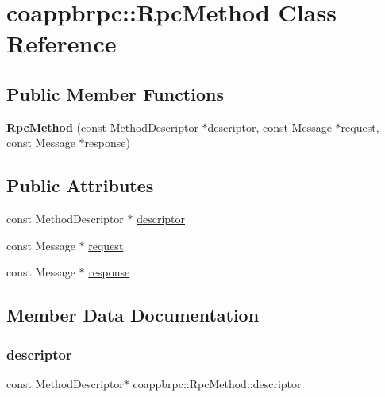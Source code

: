 \hypertarget{classcoappbrpc_1_1RpcMethod}{}\section{coappbrpc\+:\+:Rpc\+Method Class Reference}
\label{classcoappbrpc_1_1RpcMethod}
\subsection*{Public Member Functions}
\begin{DoxyCompactItemize}
\item 
\mbox{\label{classcoappbrpc_1_1RpcMethod_af48f7fb693239a6b0359dc083b855a93}} 
{\bfseries Rpc\+Method} (const Method\+Descriptor $\ast$\hyperlink{classcoappbrpc_1_1RpcMethod_a52010a290e164174ca969c8904d1f3da}{descriptor}, const Message $\ast$\hyperlink{classcoappbrpc_1_1RpcMethod_ac8d0272f2480f41d10c91c023708b8f8}{request}, const Message $\ast$\hyperlink{classcoappbrpc_1_1RpcMethod_a95a64db4546c8e418232fafa297fc9a5}{response})
\end{DoxyCompactItemize}
\subsection*{Public Attributes}
\begin{DoxyCompactItemize}
\item 
const Method\+Descriptor $\ast$ \hyperlink{classcoappbrpc_1_1RpcMethod_a52010a290e164174ca969c8904d1f3da}{descriptor}
\item 
const Message $\ast$ \hyperlink{classcoappbrpc_1_1RpcMethod_ac8d0272f2480f41d10c91c023708b8f8}{request}
\item 
const Message $\ast$ \hyperlink{classcoappbrpc_1_1RpcMethod_a95a64db4546c8e418232fafa297fc9a5}{response}
\end{DoxyCompactItemize}


\subsection{Member Data Documentation}
\mbox{\label{classcoappbrpc_1_1RpcMethod_a52010a290e164174ca969c8904d1f3da}} 
\subsubsection{\texorpdfstring{descriptor}{descriptor}}
{\footnotesize\ttfamily const Method\+Descriptor$\ast$ coappbrpc\+::\+Rpc\+Method\+::descriptor}

